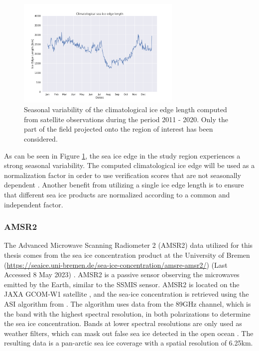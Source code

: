 \documentclass[../main/thesis.tex]{subfiles}
\begin{document}
\begin{figure}
    \centering
    \includegraphics[width = 0.7\textwidth]{clim_iceedge.pdf}
    \caption{\label{fig:clim_iceedge} Seasonal variability of the climatological ice edge length computed from satellite observations during the period 2011 - 2020. Only the part of the field projected onto the region of interest has been considered.}
\end{figure}

As can be seen in Figure \ref{fig:clim_iceedge}, the sea ice edge in the study region experiences a strong seasonal variability. The computed climatological ice edge will be used as a normalization factor in order to use verification scores that are not seasonally dependent \citep{Goessling2016, Zampieri2019, Palerme2019}. Another benefit from utilizing a single ice edge length is to ensure that different sea ice products are normalized according to a common and independent factor.

\subsubsection{AMSR2}
\label{sec:amsr2}
The Advanced Microwave Scanning Radiometer 2 (AMSR2) data utilized for this thesis comes from the sea ice concentration product at the University of Bremen (\url{https://seaice.uni-bremen.de/sea-ice-concentration/amsre-amsr2/}) (Last Accessed 8 May 2023) \citep{Spreen2008}. AMSR2 is a passive sensor observing the microwaves emitted by the Earth, similar to the SSMIS sensor. AMSR2 is located on the JAXA GCOM-W1 satellite \citep{Melsheimer2019}, and the sea-ice concentration is retrieved using the ASI algorithm from \citet{Spreen2008}. The algorithm uses data from the 89GHz channel, which is the band with the highest spectral resolution, in both polarizations to determine the sea ice concentration. Bands at lower spectral resolutions are only used as weather filters, which can mask out false sea ice detected in the open ocean \citep{Spreen2008}. The resulting data is a pan-arctic sea ice coverage with a spatial resolution of 6.25km.
\end{document}
